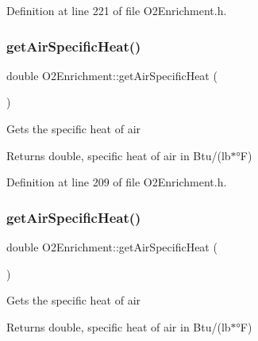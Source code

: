 Definition at line 221 of file O2\+Enrichment.\+h.

\mbox{\label{class_o2_enrichment_a435552fca78d0648dddaf406e250e9b6}} 
\subsubsection{\texorpdfstring{get\+Air\+Specific\+Heat()}{getAirSpecificHeat()}\hspace{0.1cm}{\footnotesize\ttfamily [1/3]}}
{\footnotesize\ttfamily double O2\+Enrichment\+::get\+Air\+Specific\+Heat (\begin{DoxyParamCaption}{ }\end{DoxyParamCaption})\hspace{0.3cm}{\ttfamily [inline]}}

Gets the specific heat of air \begin{DoxyReturn}{Returns}
double, specific heat of air in Btu/(lb$\ast$°F) 
\end{DoxyReturn}


Definition at line 209 of file O2\+Enrichment.\+h.

\mbox{\label{class_o2_enrichment_a435552fca78d0648dddaf406e250e9b6}} 
\subsubsection{\texorpdfstring{get\+Air\+Specific\+Heat()}{getAirSpecificHeat()}\hspace{0.1cm}{\footnotesize\ttfamily [2/3]}}
{\footnotesize\ttfamily double O2\+Enrichment\+::get\+Air\+Specific\+Heat (\begin{DoxyParamCaption}{ }\end{DoxyParamCaption})\hspace{0.3cm}{\ttfamily [inline]}}

Gets the specific heat of air \begin{DoxyReturn}{Returns}
double, specific heat of air in Btu/(lb$\ast$°F) 
\end{DoxyReturn}



